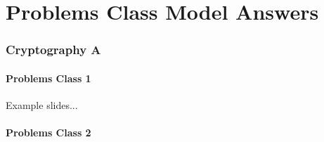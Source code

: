 \documentclass[oneside,a4paper,12pt]{book}
\begin{document}
\part{Problems Class Model Answers}
\section{Cryptography A}
\subsection{Problems Class 1}
Example slides...

\subsection{Problems Class 2}
\end{document}
